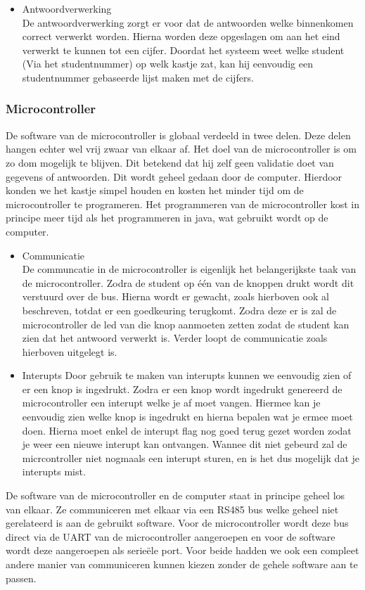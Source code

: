 \documentclass[a4paper,titlepage]{artikel1}
\begin{document}
\begin{itemize}
  \item Antwoordverwerking \\
    De antwoordverwerking zorgt er voor dat de antwoorden welke binnenkomen correct verwerkt worden. Hierna worden deze opgeslagen om aan het eind verwerkt te kunnen tot een cijfer. Doordat het systeem weet welke student (Via het studentnummer) op welk kastje zat, kan hij eenvoudig een studentnummer gebaseerde lijst maken met de cijfers. 
\end{itemize}
\subsubsection{Microcontroller}
De software van de microcontroller is globaal verdeeld in twee delen. Deze delen hangen echter wel vrij zwaar van elkaar af. Het doel van de microcontroller is om zo dom mogelijk te blijven. Dit betekend dat hij zelf geen validatie doet van gegevens of antwoorden. Dit wordt geheel gedaan door de computer. Hierdoor konden we het kastje simpel houden en kosten het minder tijd om de microcontroller te programeren. Het programmeren van de microcontroller kost in principe meer tijd als het programmeren in java, wat gebruikt wordt op de computer.
\begin{itemize}
  \item Communicatie\\
    De communcatie in de microcontroller is eigenlijk het belangerijkste taak van de microcontroller. Zodra de student op één van de knoppen drukt wordt dit verstuurd over de bus. Hierna wordt er gewacht, zoals hierboven ook al beschreven, totdat er een goedkeuring terugkomt. Zodra deze er is zal de microcontroller de led van die knop aanmoeten zetten zodat de student kan zien dat het antwoord verwerkt is. Verder loopt de communicatie zoals hierboven uitgelegt is.
  \item Interupts
    Door gebruik te maken van interupts kunnen we eenvoudig zien of er een knop is ingedrukt. Zodra er een knop wordt ingedrukt genereerd de microcontroller een interupt welke je af moet vangen. Hiermee kan je eenvoudig zien welke knop is ingedrukt en hierna bepalen wat je ermee moet doen. Hierna moet enkel de interupt flag nog goed terug gezet worden zodat je weer een nieuwe interupt kan ontvangen. Wannee dit niet gebeurd zal de micrcontroller niet nogmaals een interupt sturen, en is het dus mogelijk dat je interupts mist.
\end{itemize}
De software van de microcontroller en de computer staat in principe geheel los van elkaar. Ze communiceren met elkaar via een RS485 bus welke geheel niet gerelateerd is aan de gebruikt software. Voor de microcontroller wordt deze bus direct via de UART van de microcontroller aangeroepen en voor de software wordt deze aangeroepen als serie\"{e}le port. Voor beide hadden we ook een compleet andere manier van communiceren kunnen kiezen zonder de gehele software aan te passen.
\end{document}
